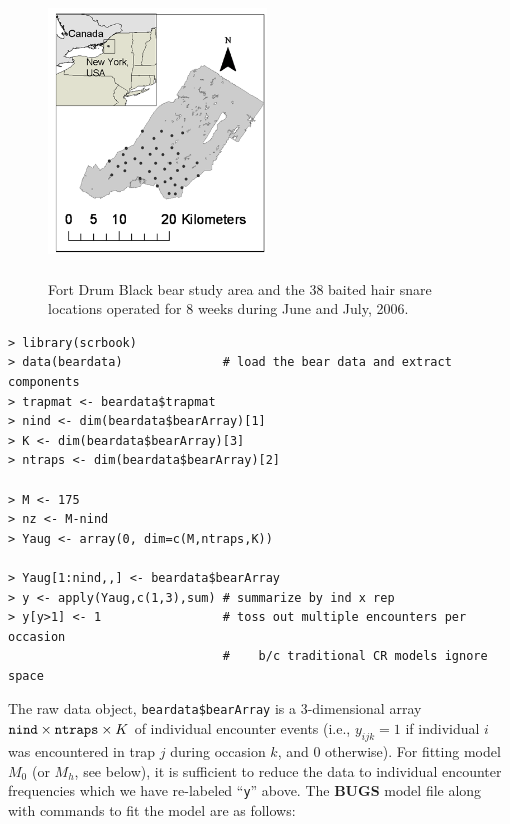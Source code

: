 \begin{figure}[ht]
\centering
\includegraphics[height=3in,width=2.28in]{Ch4-Closed/figs/hairsnares.png}
\caption{Fort Drum Black bear study area and the 38 baited hair snare
  locations operated for 8 weeks during June and July, 2006.}
\label{closed.fig.fortdrum}
\end{figure}

{\small
\begin{verbatim}
> library(scrbook)
> data(beardata)              # load the bear data and extract components
> trapmat <- beardata$trapmat
> nind <- dim(beardata$bearArray)[1]
> K <- dim(beardata$bearArray)[3]
> ntraps <- dim(beardata$bearArray)[2]

> M <- 175
> nz <- M-nind
> Yaug <- array(0, dim=c(M,ntraps,K))

> Yaug[1:nind,,] <- beardata$bearArray 
> y <- apply(Yaug,c(1,3),sum) # summarize by ind x rep
> y[y>1] <- 1                 # toss out multiple encounters per occasion
                              #    b/c traditional CR models ignore space
\end{verbatim}
}


The raw data object, \mbox{\tt beardata\$bearArray} is a 3-dimensional
array $\mbox{\tt nind} \times \mbox{\tt ntraps} \times K$ of
individual encounter events (i.e., $y_{ijk} = 1$ if individual $i$ was
encountered in trap $j$ during occasion $k$, and 0 otherwise).  For
fitting model $M_{0}$ (or $M_{h}$, see below), it is sufficient to
reduce the data to individual encounter frequencies which we have
re-labeled ``\mbox{\tt y}'' above.  The {\bf BUGS} model file along with
commands to fit the model are as follows:


